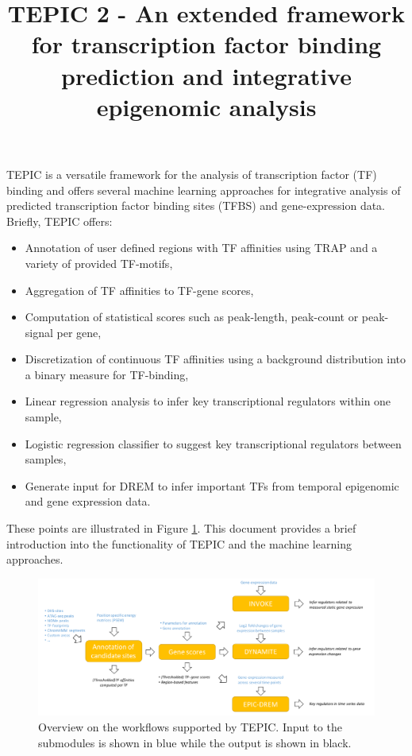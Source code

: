 \documentclass{article}
\date{}
\begin{document}
\title{TEPIC 2 - An extended framework for transcription factor binding prediction and integrative epigenomic analysis}
\maketitle

TEPIC is a versatile framework for the analysis of transcription factor (TF) binding and offers several machine learning approaches for integrative analysis of predicted transcription factor binding sites (TFBS) and gene-expression data.
Briefly, TEPIC offers:
\begin{itemize}
\item Annotation of user defined regions with TF affinities using TRAP and a variety of provided TF-motifs,
\item Aggregation of TF affinities to TF-gene scores,
\item Computation of statistical scores such as peak-length, peak-count or peak-signal per gene,
\item Discretization of continuous TF affinities using a background distribution into a binary measure for TF-binding,
\item Linear regression analysis to infer key transcriptional regulators within one sample,
\item Logistic regression classifier to suggest key transcriptional regulators between samples,
\item Generate input for DREM to infer important TFs from temporal epigenomic and gene expression data.
\end{itemize}

These points are illustrated in Figure \ref{FigOverview}.
This document provides a brief introduction into the functionality of TEPIC and the machine learning approaches. 
\begin{figure}[h]
\includegraphics[width=\textwidth]{workflow_TEPIC_General.pdf}
\caption{Overview on the workflows supported by TEPIC. Input to the submodules is shown in blue while the output is shown in black.}
\label{FigOverview}
\end{figure}
\newpage
\end{document}
